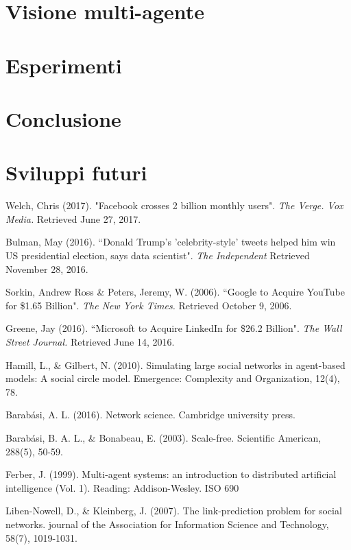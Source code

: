 \documentclass[a4paper,12pt]{article}
\begin{document}
\section{Visione multi-agente}
\label{sec:mas}
\section{Esperimenti}
\label{sec:esp}
\section{Conclusione}
\label{sec:end}
\section{Sviluppi futuri}
\label{sec:future}


\begin{thebibliography}{9}
  Welch, Chris (2017). "Facebook crosses 2 billion monthly users". \textit{The Verge. Vox Media.} Retrieved June 27, 2017.
  
  Bulman, May (2016). ``Donald Trump's 'celebrity-style' tweets helped him win US presidential election, says data scientist".
\textit{The Independent} Retrieved November 28, 2016.

   Sorkin, Andrew Ross \& Peters, Jeremy, W. (2006). ``Google to Acquire YouTube for \$1.65 Billion". \textit{The New York Times.} Retrieved October 9, 2006.

   Greene, Jay (2016). ``Microsoft to Acquire LinkedIn for \$26.2 Billion". \textit{The Wall Street Journal.} Retrieved June 14, 2016.

  Hamill, L., \& Gilbert, N. (2010). Simulating large social networks in agent-based models: A social circle model. Emergence: Complexity and Organization, 12(4), 78.

  Barabási, A. L. (2016). Network science. Cambridge university press.
  
  Barabási, B. A. L., \& Bonabeau, E. (2003). Scale-free. Scientific American, 288(5), 50-59.
  
  Ferber, J. (1999). Multi-agent systems: an introduction to distributed artificial intelligence (Vol. 1). Reading: Addison-Wesley.
ISO 690	

  Liben-Nowell, D., \& Kleinberg, J. (2007). The link-prediction problem for social networks. journal of the Association for Information Science and Technology, 58(7), 1019-1031.
  

\end{thebibliography}
\end{document}
